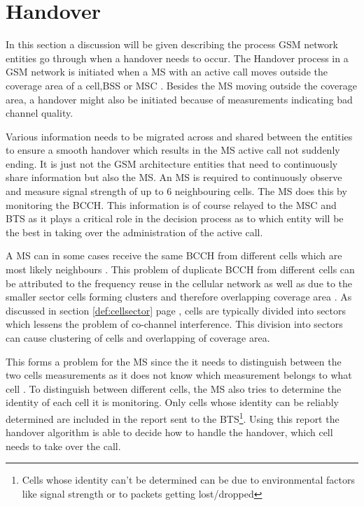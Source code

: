 \section{Handover}
\label{sec:handover}
In this section a discussion will be given describing the process GSM network entities go through when a handover needs to occur. The Handover process in a GSM network is initiated when a MS with an active call moves outside the coverage area of a cell,BSS or MSC \cite{GSMArchitectureProtocolsServices,wirelesstelcoMullet,Eisenblatter}. Besides the MS moving outside the coverage area, a handover might also be initiated because of measurements indicating bad channel quality\cite{GSMArchitectureProtocolsServices}. 

Various information needs to be migrated across and shared between the entities to ensure a smooth handover which results in the MS active call not suddenly ending. It is just not the GSM architecture entities that need to continuously share information but also the MS. An MS is required to continuously observe and measure signal strength of up to 6 neighbouring cells. The MS does this by monitoring the BCCH\cite{GSMArchitectureProtocolsServices,wirelesstelcoMullet}. This information is of course relayed to the MSC and BTS as it plays a critical role in the decision process as to which entity will be the best in taking over the administration of the active call\cite{GSMArchitectureProtocolsServices,wirelesstelcoMullet}.

A MS can in some cases receive the same BCCH from different cells which are most likely neighbours \cite{GSMArchitectureProtocolsServices}. This problem of duplicate BCCH from different cells can be attributed to the frequency reuse in the cellular network as well as due to the smaller sector cells forming clusters and therefore overlapping coverage area \cite{GSMArchitectureProtocolsServices}. As discussed in section \ref{def:cellsector} page \pageref{def:cellsector}, cells are typically divided into sectors which lessens the problem of co-channel interference. This division into sectors can cause clustering of cells and overlapping of coverage area.

This forms a problem for the MS since the it needs to distinguish between the two cells measurements as it does not know which measurement belongs to what cell \cite{GSMArchitectureProtocolsServices}. To distinguish between different cells, the MS also tries to determine the identity of each cell it is monitoring. Only cells whose identity can be reliably determined are included in the report sent to the BTS\cite{Eisenblatter,GSMArchitectureProtocolsServices,wirelesstelcoMullet}\footnote{Cells whose identity can't be determined can be due to environmental factors like signal strength or to packets getting lost/dropped}. Using this report the handover algorithm is able to decide how to handle the handover, which cell needs to take over the call\cite{Eisenblatter,GSMArchitectureProtocolsServices,wirelesstelcoMullet}.

